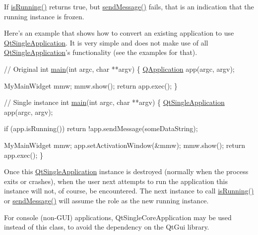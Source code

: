 If \hyperlink{class_qt_single_application_aa9f0e6e4f18ac79bbb7a955cd860894d}{is\-Running()} returns true, but \hyperlink{class_qt_single_application_a0e2f3900f0290913c738ec6b4b959922}{send\-Message()} fails, that is an indication that the running instance is frozen.

Here's an example that shows how to convert an existing application to use \hyperlink{class_qt_single_application}{Qt\-Single\-Application}. It is very simple and does not make use of all \hyperlink{class_qt_single_application}{Qt\-Single\-Application}'s functionality (see the examples for that).


\begin{DoxyCode}
\textcolor{comment}{// Original}
\textcolor{keywordtype}{int} \hyperlink{main_8cpp_a3c04138a5bfe5d72780bb7e82a18e627}{main}(\textcolor{keywordtype}{int} argc, \textcolor{keywordtype}{char} **argv)
\{
    \hyperlink{class_q_application}{QApplication} app(argc, argv);

    MyMainWidget mmw;
    mmw.show();
    \textcolor{keywordflow}{return} app.exec();
\}

\textcolor{comment}{// Single instance}
\textcolor{keywordtype}{int} \hyperlink{main_8cpp_a3c04138a5bfe5d72780bb7e82a18e627}{main}(\textcolor{keywordtype}{int} argc, \textcolor{keywordtype}{char} **argv)
\{
    \hyperlink{class_qt_single_application}{QtSingleApplication} app(argc, argv);

    \textcolor{keywordflow}{if} (app.isRunning())
        \textcolor{keywordflow}{return} !app.sendMessage(someDataString);

    MyMainWidget mmw;
    app.setActivationWindow(&mmw);
    mmw.show();
    \textcolor{keywordflow}{return} app.exec();
\}
\end{DoxyCode}


Once this \hyperlink{class_qt_single_application}{Qt\-Single\-Application} instance is destroyed (normally when the process exits or crashes), when the user next attempts to run the application this instance will not, of course, be encountered. The next instance to call \hyperlink{class_qt_single_application_aa9f0e6e4f18ac79bbb7a955cd860894d}{is\-Running()} or \hyperlink{class_qt_single_application_a0e2f3900f0290913c738ec6b4b959922}{send\-Message()} will assume the role as the new running instance.

For console (non-\/\-G\-U\-I) applications, Qt\-Single\-Core\-Application may be used instead of this class, to avoid the dependency on the Qt\-Gui library.

